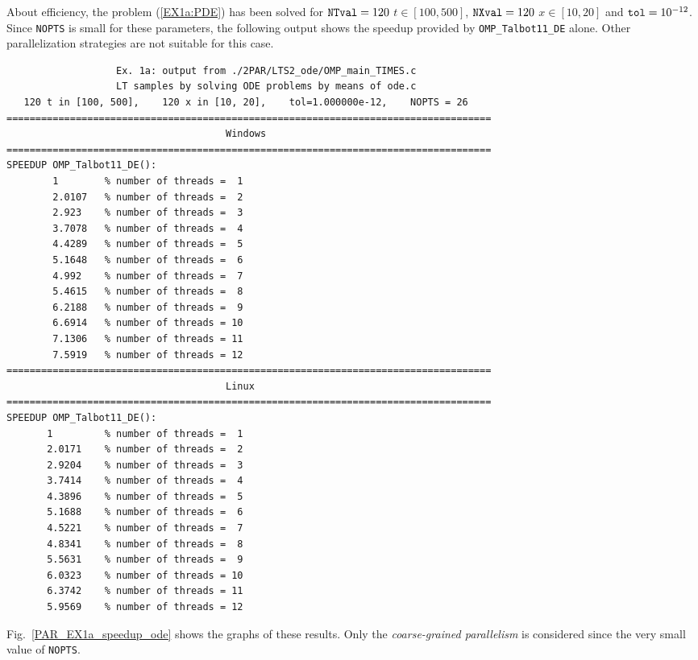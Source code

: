 \documentclass[a4paper,10pt]{report}%
\begin{document}
About efficiency, the problem (\ref{EX1a:PDE}) has been solved for ${\tt NTval}=120$ $t\in[100,500]$, ${\tt NXval}=120$
$x\in[10,20]$ and ${\tt tol}=10^{-12}$. Since {\tt NOPTS} is small for these parameters, the following output shows
the speedup provided by {\tt OMP\_Talbot11\_DE} alone. Other parallelization strategies are not suitable for this
case.
\begin{lstlisting}
                   Ex. 1a: output from ./2PAR/LTS2_ode/OMP_main_TIMES.c
                   LT samples by solving ODE problems by means of ode.c
   120 t in [100, 500],    120 x in [10, 20],    tol=1.000000e-12,    NOPTS = 26
====================================================================================
                                      Windows
====================================================================================
SPEEDUP OMP_Talbot11_DE():
        1        % number of threads =  1
        2.0107   % number of threads =  2
        2.923    % number of threads =  3
        3.7078   % number of threads =  4
        4.4289   % number of threads =  5
        5.1648   % number of threads =  6
        4.992    % number of threads =  7
        5.4615   % number of threads =  8
        6.2188   % number of threads =  9
        6.6914   % number of threads = 10
        7.1306   % number of threads = 11
        7.5919   % number of threads = 12
====================================================================================
                                      Linux
====================================================================================
SPEEDUP OMP_Talbot11_DE():
       1         % number of threads =  1
       2.0171    % number of threads =  2
       2.9204    % number of threads =  3
       3.7414    % number of threads =  4
       4.3896    % number of threads =  5
       5.1688    % number of threads =  6
       4.5221    % number of threads =  7
       4.8341    % number of threads =  8
       5.5631    % number of threads =  9
       6.0323    % number of threads = 10
       6.3742    % number of threads = 11
       5.9569    % number of threads = 12
\end{lstlisting}
Fig.~\ref{PAR_EX1a_speedup_ode} shows the graphs of these results.
Only the {\em coarse-grained parallelism} is considered since the very small value of {\tt NOPTS}.
\end{document}
